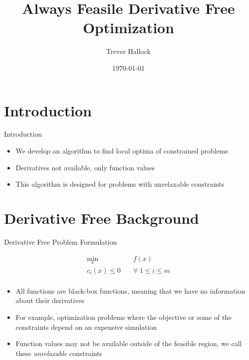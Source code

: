 \documentclass{beamer}
\begin{document}
\title{Always Feasile Derivative Free Optimization}   
\author{Trever Hallock} 
\date{\today} 

\frame{\titlepage} 

\section{Introduction}

\begin{frame}{Introduction}
	\begin{itemize}
		\item We develop an algorithm to find local optima of constrained problems
		\item Derivatives not available, only function values
		\item This algorithm is designed for problems with unrelaxable constraints
	\end{itemize}
\end{frame}

\section{Derivative Free Background}

\begin{frame}{Derivative Free Problem Formulation}
\begin{center}
\label{Problem}
\begin{align*}
\min_x & \quad f(x) \\
  c_i(x) \le 0   & \quad \forall \; 1 \le i \le m \\
\end{align*}
\end{center}
	\begin{itemize}
		\item All functions are black-box functions, meaning that we have no information about their derivatives
		\item For example, optimization problems where the objective or some of the constraints depend on an expensive simulation
		\item Function values may not be available outside of the feasible region, 
		we call these \emph{unrelaxable} constraints
	\end{itemize}
\end{frame}
\end{document}
